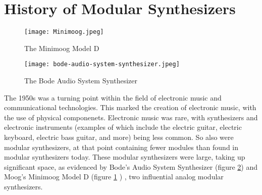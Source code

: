 \section[History of Modular Synthesizers]{History of Modular Synthesizers}\label{section:mod-synth-history}

\begin{figure}
  \centering
  \texttt{[image: Minimoog.jpeg]}
  \caption{The Minimoog Model D}
  \label{fig:minimoog}
\end{figure}

\begin{figure}
  \centering
  \texttt{[image: bode-audio-system-synthesizer.jpeg]}
  \caption{The Bode Audio System Synthesizer}
  \label{fig:bode-audio-system-synthesizer}
\end{figure}


The 1950s was a turning point within the field of electronic music and communicational technologies. This marked the creation of electronic music, with the use of physical componenets. Electronic music was rare, with synthesizers and electronic instruments (examples of which include the electric guitar, electric keyboard, electric bass guitar, and more) being less common. So also were modular synthesizers, at that point containing fewer modules than found in modular synthesizers today. These modular synthesizers were large, taking up significant space, as evidenced by Bode's Audio System Synthesizer (figure \ref{fig:bode-audio-system-synthesizer}) \cite{Crab_2019} \cite{Says_2014} and Moog's Minimoog Model D (figure \ref{fig:minimoog} \cite{Krash_2005}) \cite{Pinch_Trocco_1998} \cite{Pinch_Trocco_2004}, two influential analog modular synthesizers.

